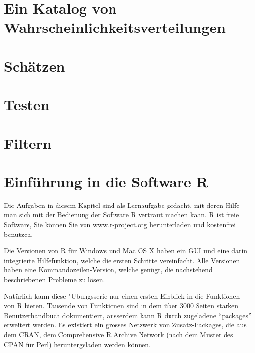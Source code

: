 \documentclass[a4paper,12pt]{book}
\begin{document}
\chapter{Ein Katalog von Wahrscheinlichkeitsverteilungen}

\chapter{Schätzen}

\chapter{Testen}

\chapter{Filtern}

\chapter{Einführung in die Software R}
Die Aufgaben in diesem Kapitel sind als Lernaufgabe gedacht, mit deren
Hilfe man sich mit der Bedienung der Software R vertraut machen kann.
R ist freie Software, Sie können Sie von \url{www.r-project.org}
herunterladen und kostenfrei benutzen.

Die Versionen von R für Windows und Mac OS X haben ein GUI und eine darin
integrierte Hilfefunktion, welche die ersten Schritte vereinfacht. Alle
Versionen haben eine Kommandozeilen-Version, welche genügt, die nachstehend
beschriebenen Probleme zu lösen.

Natürlich kann diese "Ubungsserie nur einen ersten Einblick in die
Funktionen von R bieten. Tausende von Funktionen sind in dem über 3000
Seiten starken Benutzerhandbuch dokumentiert, ausserdem kann R durch
zugeladene ``packages'' erweitert werden. Es existiert ein grosses Netzwerk
von Zusatz-Packages, die aus dem CRAN, dem Comprehensive R Archive
Network (nach dem Muster des CPAN für Perl) heruntergeladen werden
können.

\bigskip

\closethemaindex
\printthemata

\end{document}
